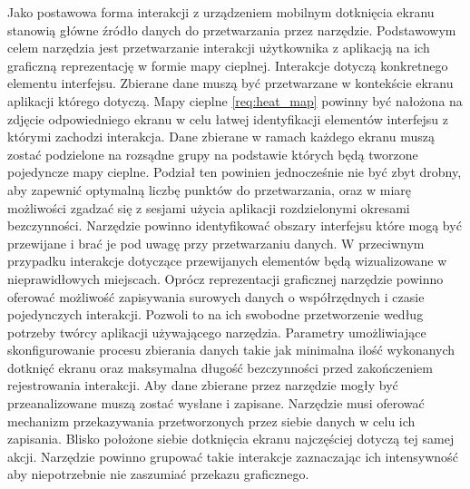 \begin{enumerate}[label=\textbf{F.\arabic*}]
	 Jako postawowa forma interakcji z urządzeniem mobilnym dotknięcia ekranu stanowią główne źródło danych do przetwarzania przez narzędzie.
	 Podstawowym celem narzędzia jest przetwarzanie interakcji użytkownika z aplikacją na ich graficzną reprezentację w formie mapy cieplnej. 
	 Interakcje dotyczą konkretnego elementu interfejsu. Zbierane dane muszą być przetwarzane w kontekście ekranu aplikacji którego dotyczą. Mapy cieplne \ref{req:heat_map} powinny być nałożona na zdjęcie odpowiedniego ekranu w celu łatwej identyfikacji elementów interfejsu z którymi zachodzi interakcja.
	 Dane zbierane w ramach każdego ekranu muszą zostać podzielone na rozsądne grupy na podstawie których będą tworzone pojedyncze mapy cieplne. Podział ten powinien jednocześnie nie być zbyt drobny, aby zapewnić optymalną liczbę punktów do przetwarzania, oraz w miarę możliwości zgadzać się z sesjami użycia aplikacji rozdzielonymi okresami bezczynności.
	 Narzędzie powinno identyfikować obszary interfejsu które mogą być przewijane i brać je pod uwagę przy przetwarzaniu danych. W przeciwnym przypadku interakcje dotyczące przewijanych elementów będą wizualizowane w nieprawidłowych miejscach.
	 Oprócz reprezentacji graficznej narzędzie powinno oferować możliwość zapisywania surowych danych o współrzędnych i czasie pojedynczych interakcji. Pozwoli to na ich swobodne przetworzenie według potrzeby twórcy aplikacji używającego narzędzia.
	 Parametry umożliwiające skonfigurowanie procesu zbierania danych takie jak minimalna ilość wykonanych dotknięć ekranu oraz maksymalna długość bezczynności przed zakończeniem rejestrowania interakcji.
	 Aby dane zbierane przez narzędzie mogły być przeanalizowane muszą zostać wysłane i zapisane. Narzędzie musi oferować mechanizm przekazywania przetworzonych przez siebie danych w celu ich zapisania.
	 Blisko położone siebie dotknięcia ekranu najczęściej dotyczą tej samej akcji. Narzędzie powinno grupować takie interakcje zaznaczając ich intensywność aby niepotrzebnie nie zaszumiać przekazu graficznego.

\end{enumerate}
